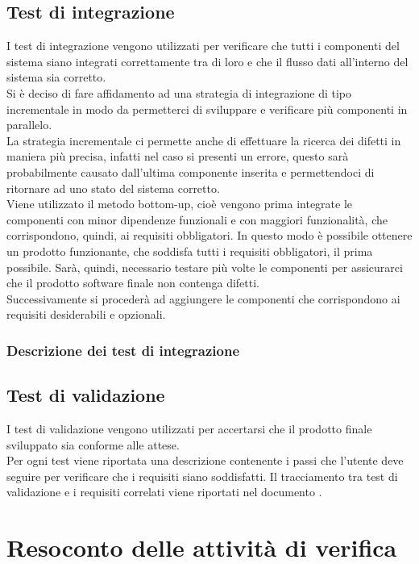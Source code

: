 	\subsection{Test di integrazione}
		I test di integrazione vengono utilizzati per verificare che tutti i componenti del sistema siano integrati correttamente tra di loro e che il flusso dati all'interno del sistema sia corretto.\\
		Si è deciso di fare affidamento ad una strategia di integrazione di tipo incrementale in modo da permetterci di sviluppare e verificare più componenti in parallelo.\\
		La strategia incrementale ci permette anche di effettuare la ricerca dei difetti in maniera più precisa, infatti nel caso si presenti un errore, questo sarà probabilmente causato dall'ultima componente inserita e permettendoci di ritornare ad uno stato del sistema corretto.\\
		Viene utilizzato il metodo bottom-up, cioè vengono prima integrate le componenti con minor dipendenze funzionali e con maggiori funzionalità, che corrispondono, quindi, ai requisiti obbligatori. In questo modo è possibile ottenere un prodotto funzionante, che soddisfa tutti i requisiti obbligatori, il prima possibile. Sarà, quindi, necessario testare più volte le componenti per assicurarci che il prodotto software finale non contenga difetti.\\ Successivamente si procederà ad aggiungere le componenti che corrispondono ai requisiti desiderabili e opzionali.
		 
		\subsubsection{Descrizione dei test di integrazione}
	
	\subsection{Test di validazione}
		I test di validazione vengono utilizzati per accertarsi che il prodotto finale sviluppato sia conforme alle attese.\\
		Per ogni test viene riportata una descrizione contenente i passi che l'utente deve seguire per verificare che i requisiti siano soddisfatti. Il tracciamento tra test di validazione e i requisiti correlati viene riportati nel documento \docNameVersionAdR.
		
\pagebreak


\section{Resoconto delle attività di verifica}
